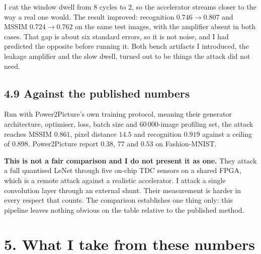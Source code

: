 \documentclass[11pt,a4paper]{article}
\begin{document}
I cut the window dwell from $8$ cycles to $2$, so the accelerator streams closer to the way
a real one would. The result improved: recognition $0.746 \to 0.807$ and MSSIM
$0.724 \to 0.762$ on the same test images, with the amplifier absent in both cases. That
gap is about six standard errors, so it is not noise, and I had predicted the opposite
before running it. Both bench artifacts I introduced, the leakage amplifier and the slow
dwell, turned out to be things the attack did not need.

\begin{table}[H]
  \centering
  \small
  \resizebox{\textwidth}{!}{}
  \caption{Window dwell at zero amplifier, $56$k training traces.}
  \label{tab:dwell}
\end{table}

\subsection*{4.9 Against the published numbers}

Run with Power2Picture's own training protocol, meaning their generator architecture,
optimiser, loss, batch size and $60\,000$-image profiling set, the attack reaches MSSIM
$0.861$, pixel distance $14.5$ and recognition $0.919$ against a ceiling of $0.898$.
Power2Picture report $0.38$, $77$ and $0.53$ on Fashion-MNIST.

\textbf{This is not a fair comparison and I do not present it as one.} They attack a full
quantised LeNet through five on-chip TDC sensors on a shared FPGA, which is a remote attack
against a realistic accelerator. I attack a single convolution layer through an external
shunt. Their measurement is harder in every respect that counts. The comparison
establishes one thing only: this pipeline leaves nothing obvious on the table relative to
the published method.

\section*{5. What I take from these numbers}
\end{document}
